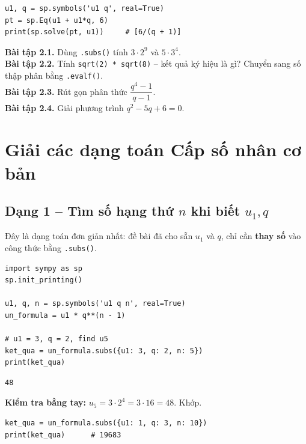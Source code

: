 \documentclass[12pt,a4paper]{report}
\begin{document}
\begin{lstlisting}[caption={Giải một phương trình}]
u1, q = sp.symbols('u1 q', real=True)
pt = sp.Eq(u1 + u1*q, 6)
print(sp.solve(pt, u1))     # [6/(q + 1)]
\end{lstlisting}

\begin{exbox}
\textbf{Bài tập 2.1.} Dùng \texttt{.subs()} tính $3 \cdot 2^9$ và
$5 \cdot 3^{4}$.\\[2pt]
\textbf{Bài tập 2.2.} Tính \texttt{sqrt(2) * sqrt(8)} -- kết quả ký hiệu
là gì? Chuyển sang số thập phân bằng \texttt{.evalf()}.\\[2pt]
\textbf{Bài tập 2.3.} Rút gọn phân thức
$\dfrac{q^4 - 1}{q - 1}$.\\[2pt]
\textbf{Bài tập 2.4.} Giải phương trình $q^2 - 5q + 6 = 0$.
\end{exbox}

\newpage

\chapter{Giải các dạng toán Cấp số nhân cơ bản}

\section{Dạng 1 -- Tìm số hạng thứ $n$ khi biết $u_1, q$}

Đây là dạng toán đơn giản nhất: đề bài đã cho sẵn $u_1$ và $q$, chỉ cần
\textbf{thay số} vào công thức bằng \texttt{.subs()}.

\begin{lstlisting}[caption={Ví dụ 1: Tìm $u_5$ khi $u_1 = 3, q = 2$}]
import sympy as sp
sp.init_printing()

u1, q, n = sp.symbols('u1 q n', real=True)
un_formula = u1 * q**(n - 1)

# u1 = 3, q = 2, find u5
ket_qua = un_formula.subs({u1: 3, q: 2, n: 5})
print(ket_qua)
\end{lstlisting}

\begin{lstlisting}[style=outstyle,numbers=none]
48
\end{lstlisting}

\noindent\textbf{Kiểm tra bằng tay:}
$u_5 = 3 \cdot 2^{4} = 3 \cdot 16 = 48$. Khớp.

\begin{lstlisting}[caption={Ví dụ 2: Tìm $u_{10}$ khi $u_1 = 1, q = 3$}]
ket_qua = un_formula.subs({u1: 1, q: 3, n: 10})
print(ket_qua)      # 19683
\end{lstlisting}
\end{document}
